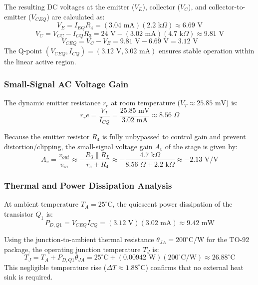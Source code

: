 \documentclass[conference,letterpaper]{IEEEtran}
\begin{document}
The resulting DC voltages at the emitter ($V_E$), collector ($V_C$), and collector-to-emitter ($V_{CEQ}$) are calculated as:
\begin{equation}
    V_E = I_{EQ} R_4 = (3.04\text{~mA})(2.2\text{~k}\Omega) \approx 6.69\text{~V}
\end{equation}
\begin{equation}
    V_C = V_{CC} - I_{CQ} R_3 = 24\text{~V} - (3.02\text{~mA})(4.7\text{~k}\Omega) \approx 9.81\text{~V}
\end{equation}
\begin{equation}
    V_{CEQ} = V_C - V_E = 9.81\text{~V} - 6.69\text{~V} = 3.12\text{~V}
\end{equation}
The Q-point $(V_{CEQ}, I_{CQ}) = (3.12\text{~V}, 3.02\text{~mA})$ ensures stable operation within the linear active region.

\subsubsection{Small-Signal AC Voltage Gain}
The dynamic emitter resistance $r_e$ at room temperature ($V_T \approx 25.85\text{~mV}$) is:
\begin{equation}
    r_re = \frac{V_T}{I_{CQ}} = \frac{25.85\text{~mV}}{3.02\text{~mA}} \approx 8.56\text{~}\Omega
\end{equation}

Because the emitter resistor $R_4$ is fully unbypassed to control gain and prevent distortion/clipping, the small-signal voltage gain $A_v$ of the stage is given by:
\begin{equation}
    A_v = \frac{v_{out}}{v_{in}} \approx -\frac{R_3 \parallel R_L}{r_e + R_4} \approx -\frac{4.7\text{~k}\Omega}{8.56\text{~}\Omega + 2.2\text{~k}\Omega} \approx -2.13\text{~V/V}
\end{equation}

\subsubsection{Thermal and Power Dissipation Analysis}
At ambient temperature $T_A = 25^\circ\text{C}$, the quiescent power dissipation of the transistor $Q_1$ is:
\begin{equation}
    P_{D,Q1} = V_{CEQ} I_{CQ} = (3.12\text{~V})(3.02\text{~mA}) \approx 9.42\text{~mW}
\end{equation}

Using the junction-to-ambient thermal resistance $\theta_{JA} = 200^\circ\text{C/W}$ for the TO-92 package, the operating junction temperature $T_J$ is:
\begin{equation}
    T_J = T_A + P_{D,Q1} \theta_{JA} = 25^\circ\text{C} + (0.00942\text{~W})(200^\circ\text{C/W}) \approx 26.88^\circ\text{C}
\end{equation}
This negligible temperature rise ($\Delta T \approx 1.88^\circ\text{C}$) confirms that no external heat sink is required.
\end{document}
